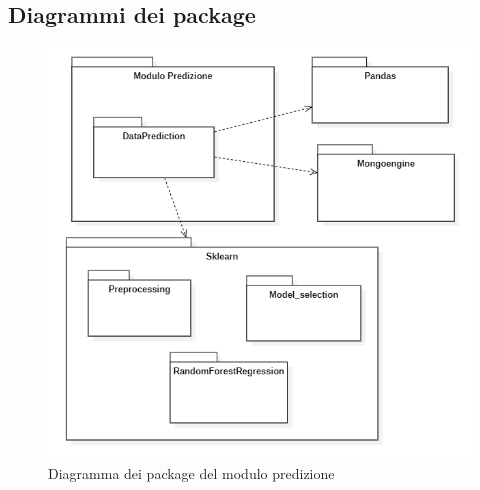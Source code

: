 \subsection{Diagrammi dei package}\label{DiagrammaDeiPackagePrediction}
\begin{center}
	\begin{figure}[H]
		\centering\includegraphics[scale=0.8]{../immagini/diag_PB/diag_pack_pred.png}
		\caption{Diagramma dei package del modulo predizione}
	\end{figure}
\end{center}

